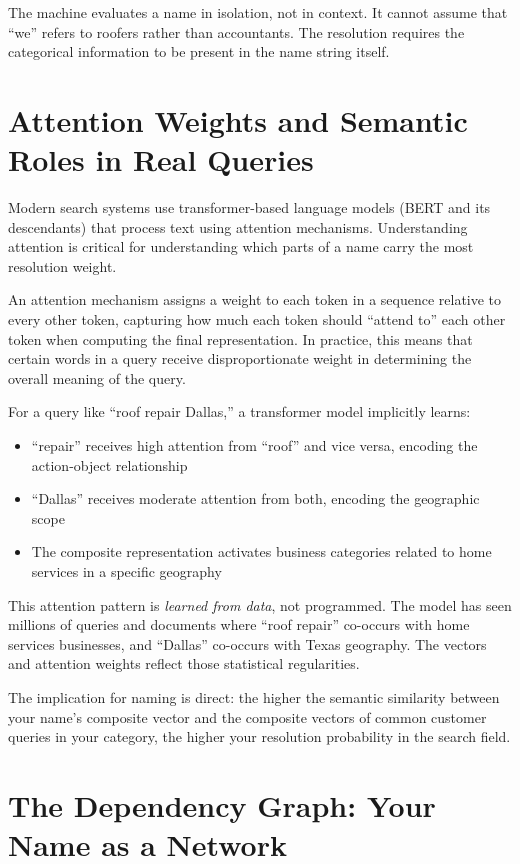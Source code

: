 \documentclass[12pt, openany]{book}
\theoremstyle{thmstyle}
\theoremstyle{defstyle}
\begin{document}
The machine evaluates a name in isolation, not in context. It cannot assume that ``we'' refers to roofers rather than accountants. The resolution requires the categorical information to be present in the name string itself.

\section{Attention Weights and Semantic Roles in Real Queries}

Modern search systems use transformer-based language models (BERT and its descendants) that process text using attention mechanisms. Understanding attention is critical for understanding which parts of a name carry the most resolution weight.

An attention mechanism assigns a weight to each token in a sequence relative to every other token, capturing how much each token should ``attend to'' each other token when computing the final representation. In practice, this means that certain words in a query receive disproportionate weight in determining the overall meaning of the query.

For a query like ``roof repair Dallas,'' a transformer model implicitly learns:
\begin{itemize}[leftmargin=1.5em]
  \item ``repair'' receives high attention from ``roof'' and vice versa, encoding the action-object relationship
  \item ``Dallas'' receives moderate attention from both, encoding the geographic scope
  \item The composite representation activates business categories related to home services in a specific geography
\end{itemize}

This attention pattern is \textit{learned from data}, not programmed. The model has seen millions of queries and documents where ``roof repair'' co-occurs with home services businesses, and ``Dallas'' co-occurs with Texas geography. The vectors and attention weights reflect those statistical regularities.

The implication for naming is direct: the higher the semantic similarity between your name's composite vector and the composite vectors of common customer queries in your category, the higher your resolution probability in the search field.

\section{The Dependency Graph: Your Name as a Network}
\end{document}

